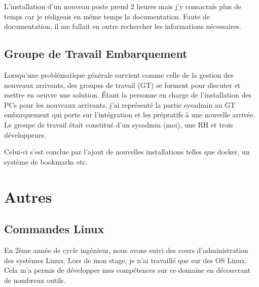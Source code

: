 \documentclass[12pt, a4paper, twoside]{article}
\begin{document}
L'installation d'un nouveau poste prend 2 heures mais j'y consacrais plus de temps car je rédigeais en même temps la documentation.
Faute de documentation, il me fallait en outre rechercher les informations nécessaires.

\subsection{Groupe de Travail Embarquement}
Lorsqu'une problématique générale survient comme celle de la gestion des nouveaux arrivants, des groupes de travail (GT) se forment pour discuter et mettre en oeuvre une solution.
Étant la personne en charge de l'installation des PCs pour les nouveaux arrivants, j'ai représenté la partie sysadmin au GT embarquement qui porte sur l'intégration et les prépratifs à une nouvelle arrivée.
Le groupe de travail était constitué d'un sysadmin (moi), une RH et trois développeurs.

Celui-ci s'est conclue par l'ajout de nouvelles installations telles que docker, un système de bookmarks etc.
\newpage
\section{Autres}
\subsection{Commandes Linux}
En 2ème année de cycle ingénieur, nous avons suivi des cours d'administration des systèmes \gls{Linux}.
Lors de mon stage, je n'ai travaillé que sur des OS \gls{Linux}.
Cela m'a permis de développer mes compétences sur ce domaine en découvrant de nombreux outils.
\end{document}
